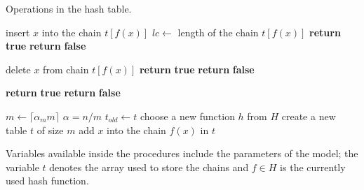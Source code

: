 \begin{algorithm}[ht]
\caption{Operations in the hash table.}
\label{algorithm-hash-table}
\begin{minipage}[t]{0.5\linewidth}
\begin{algorithmic}
		\State insert $x$ into the chain $t[f(x)]$
		\State $lc \leftarrow $ length of the chain $t[f(x)]$
			\State {}
		\EndIf
		\State \textbf{return} \textbf{true} 
	\Else
		\State \textbf{return} \textbf{false} 
	\EndIf
\EndProcedure
\end{algorithmic}
\vspace{0.1cm}
\begin{algorithmic}
		\State delete $x$ from chain $t[f(x)]$
			\State {}
		\EndIf
		\State \textbf{return} \textbf{true} 
	\Else
		\State \textbf{return} \textbf{false} 
	\EndIf
\EndProcedure
\end{algorithmic}
\end{minipage}
\hfill
\begin{minipage}[t]{0.49\linewidth}
\begin{algorithmic}
		\State \textbf{return} \textbf{true} 
	\Else
		\State \textbf{return} \textbf{false} 
	\EndIf
\EndProcedure
\end{algorithmic}
\vspace{0.1cm}
\begin{algorithmic}
	\State {}
		\State $m \leftarrow \lceil\alpha_m m\rceil$
		\State $\alpha = n / m$
	\EndIf
	\State $t_{old} \leftarrow t$
	\State choose a new function $h$ from $H$
	\Repeat
	\State create a new table $t$ of size $m$
		\State add $x$ into the chain $f(x)$ in $t$
	\EndFor
\EndProcedure
\end{algorithmic}
\end{minipage}
\begin{minipage}[t]{\linewidth}
\vspace{0.3cm}
Variables available inside the procedures include the parameters of the model; the variable $t$ denotes the array used to store the chains and $f \in H$ is the currently used hash function.
\end{minipage}
\end{algorithm}